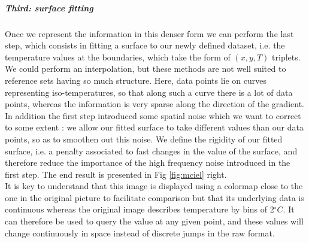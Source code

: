 \subparagraph{Third: surface fitting} Once we represent the information in this denser form we can perform the last step, which consists in fitting a surface to our newly defined dataset, i.e. the temperature values at the boundaries, which take the form of $(x,y,T)$ triplets. We could perform an interpolation, but these methods are not well suited to reference sets having so much structure. Here, data points lie on curves representing iso-temperatures, so that along such a curve there is a lot of data points, whereas the information is very sparse along the direction of the gradient. In addition the first step introduced some spatial noise which we want to correct to some extent : we allow our fitted surface to take different values than our data points, so as to smoothen out this noise. We define the rigidity of our fitted surface, i.e. a penalty associated to fast changes in the value of the surface, and therefore reduce the importance of the high frequency noise introduced in the first step. The end result is presented in Fig \ref{fig:mciel} right. \\

It is key to understand that this image is displayed using a colormap close to the one in the original picture to facilitate comparison but that its underlying data is continuous whereas the original image describes temperature by bins of 2$^{\circ}C$. It can therefore be used to query the value at any given point, and these values will change continuously in space instead of discrete jumps in the raw format.\\

